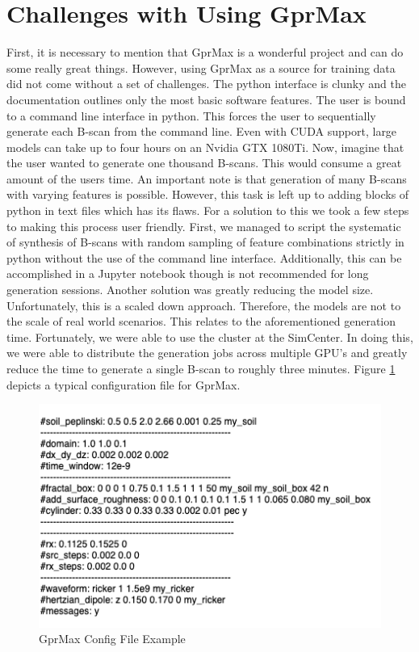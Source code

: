 \section{Challenges with Using GprMax}
First, it is necessary to mention that GprMax is a wonderful project and can do some really great things. However, using GprMax as a source for training data did not come without a set of challenges. The python interface is clunky and the documentation outlines only the most basic software features. The user is bound to a command line interface in python. This forces the user to sequentially generate each B-scan from the command line. Even with CUDA support, large models can take up to four hours on an Nvidia GTX 1080Ti. Now, imagine that the user wanted to generate one thousand B-scans. This would consume a great amount of the users time. An important note is that generation of many B-scans with varying features is possible. However, this task is left up to adding blocks of python in text files which has its flaws. For a solution to this we took a few steps to making this process user friendly. First, we managed to script the systematic of synthesis of B-scans with random sampling of feature combinations strictly in python without the use of the command line interface. Additionally, this can be accomplished in a Jupyter notebook though is not recommended for long generation sessions. Another solution was greatly reducing the model size. Unfortunately, this is a scaled down approach. Therefore, the models are not to the scale of real world scenarios. This relates to the aforementioned generation time. Fortunately, we were able to use the cluster at the SimCenter. In doing this, we were able to distribute the generation jobs across multiple GPU's and greatly reduce the time to generate a single B-scan to roughly three minutes. Figure \ref{fig:config_examlple} depicts a typical configuration file for GprMax.

\begin{figure}[H]
    \centering
    \includegraphics[width=\linewidth]{figures/config_example.png}
    \caption{GprMax Config File Example}
    \label{fig:config_examlple}
\end{figure}

